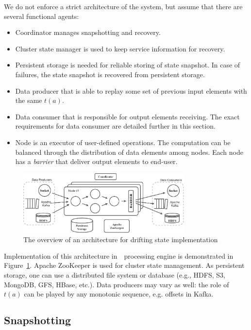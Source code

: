 We do not enforce a strict architecture of the system, but assume that there are several functional agents:
\begin{itemize}
    \item Coordinator manages snapshotting and recovery.
    \item Cluster state manager is used to keep service information for recovery.
    \item Persistent storage is needed for reliable storing of state snapshot. In case of failures, the state snapshot is recovered from persistent storage.
    \item Data producer that is able to replay some set of previous input elements with the same $t(a)$.
    \item Data consumer that is responsible for output elements receiving. The exact requirements for data consumer are detailed further in this section.
    \item Node is an executor of user-defined operations. The computation can be balanced through the distribution of data elements among nodes. Each node has a {\em barrier} that deliver output elements to end-user.
\end{itemize}

\begin{figure}[tbp]
  \centering
  \includegraphics[width=0.78\textwidth]{pics/arch}
  \caption{The overview of an architecture for drifting state implementation}
  \label {arch}
\end{figure}

Implementation of this architecture in~\FlameStream\ processing engine is demonstrated in Figure~\ref{arch}. Apache ZooKeeper is used for cluster state management. As persistent storage, one can use a distributed file system or database (e.g., HDFS, S3, MongoDB, GFS, HBase, etc.). Data producers may vary as well: the role of $t(a)$ can be played by any monotonic sequence, e.g. offsets in Kafka.

\subsection{Snapshotting}

